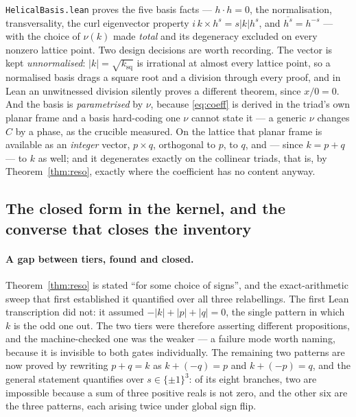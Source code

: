 \documentclass[11pt,a4paper]{article}
\theoremstyle{definition}
\theoremstyle{plain}
\begin{document}
\texttt{HelicalBasis.lean} proves the five basis facts --- $h\cdot h=0$, the normalisation,
transversality, the curl eigenvector property $i\,k\times h^s=s|k|h^s$, and
$\overline{h^s}=h^{-s}$ --- with the choice of $\nu(k)$ made \emph{total} and its degeneracy
excluded on every nonzero lattice point. Two design decisions are worth recording. The vector is
kept \emph{unnormalised}: $|k|=\sqrt{k_{\mathrm{sq}}}$ is irrational at almost every lattice point,
so a normalised basis drags a square root and a division through every proof, and in Lean an
unwitnessed division silently proves a different theorem, since $x/0=0$. And the basis is
\emph{parametrised} by $\nu$, because \eqref{eq:coeff} is derived in the triad's own planar frame
and a basis hard-coding one $\nu$ cannot state it --- a generic $\nu$ changes $C$ by a phase, as
the crucible measured. On the lattice that planar frame is available as an \emph{integer} vector,
$p\times q$, orthogonal to $p$, to $q$, and --- since $k=p+q$ --- to $k$ as well; and it degenerates
exactly on the collinear triads, that is, by Theorem~\ref{thm:reso}, exactly where the coefficient
has no content anyway.

\subsection{The closed form in the kernel, and the converse that closes the inventory}
\label{sec:closedform}

\paragraph{A gap between tiers, found and closed.}
Theorem~\ref{thm:reso} is stated ``for some choice of signs'', and the exact-arithmetic sweep that
first established it quantified over all three relabellings. The first Lean transcription did not:
it assumed $-|k|+|p|+|q|=0$, the single pattern in which $k$ is the odd one out. The two tiers were
therefore asserting different propositions, and the machine-checked one was the weaker --- a failure
mode worth naming, because it is invisible to both gates individually. The remaining two patterns
are now proved by rewriting $p+q=k$ as $k+(-q)=p$ and $k+(-p)=q$, and the general statement
quantifies over $s\in\{\pm1\}^3$: of its eight branches, two are impossible because a sum of three
positive reals is not zero, and the other six are the three patterns, each arising twice under
global sign flip.
\end{document}
